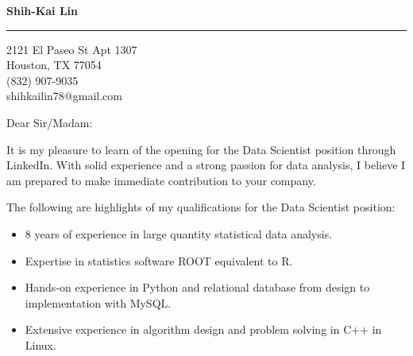 \documentclass{letter} %
\begin{document}
\signature{Shih-Kai Lin}           %
\longindentation=0pt                       %
\let\raggedleft\raggedright                %
 
 
\begin{letter}{}

\begin{center}
{\large\bf Shih-Kai Lin} 
\end{center}
\medskip\hrule height 1pt
\begin{center}
{2121 El Paseo St Apt 1307 \\   Houston, TX 77054 \\ (832) 907-9035 \\ shihkailin78@gmail.com} 
\end{center} \vfill %
 
 
\opening{Dear Sir/Madam:} 
 
\noindent %
It is my pleasure to learn of the opening for the Data Scientist position through LinkedIn. With solid experience and a strong passion for data analysis, I believe I am prepared to make immediate contribution to your company.
 
\noindent %
The following are highlights of my qualifications for the Data Scientist position:
\begin{itemize}
	\item 8 years of experience in large quantity statistical data analysis.
	\item Expertise in statistics software ROOT equivalent to R.
  \item Hands-on experience in Python and relational database from design to implementation with MySQL.
	\item Extensive experience in algorithm design and problem solving in C++ in Linux.
\end{itemize}


\end{letter}
\end{document}
